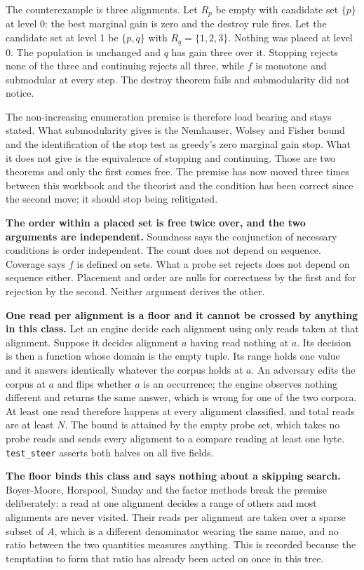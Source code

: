 The counterexample is three alignments. Let \(R_p\) be empty with candidate set \(\{p\}\) at level 0: the best marginal gain is zero and the destroy rule fires. Let the candidate set at level 1 be \(\{p, q\}\) with \(R_q = \{1,2,3\}\). Nothing was placed at level 0. The population is unchanged and \(q\) has gain three over it. Stopping rejects none of the three and continuing rejects all three, while \(f\) is monotone and submodular at every step. The destroy theorem fails and submodularity did not notice.

The non-increasing enumeration premise is therefore load bearing and stays stated. What submodularity gives is the Nemhauser, Wolsey and Fisher bound and the identification of the stop test as greedy's zero marginal gain stop. What it does not give is the equivalence of stopping and continuing. Those are two theorems and only the first comes free. The premise has now moved three times between this workbook and the theorist and the condition has been correct since the second move; it should stop being relitigated.

\textbf{The order within a placed set is free twice over, and the two arguments are independent.} Soundness says the conjunction of necessary conditions is order independent. The count does not depend on sequence. Coverage says \(f\) is defined on sets. What a probe set rejects does not depend on sequence either. Placement and order are nulls for correctness by the first and for rejection by the second. Neither argument derives the other.

\textbf{One read per alignment is a floor and it cannot be crossed by anything in this class.} Let an engine decide each alignment using only reads taken at that alignment. Suppose it decides alignment \(a\) having read nothing at \(a\). Its decision is then a function whose domain is the empty tuple. Its range holds one value and it answers identically whatever the corpus holds at \(a\). An adversary edits the corpus at \(a\) and flips whether \(a\) is an occurrence; the engine observes nothing different and returns the same answer, which is wrong for one of the two corpora. At least one read therefore happens at every alignment classified, and total reads are at least \(N\). The bound is attained by the empty probe set, which takes no probe reads and sends every alignment to a compare reading at least one byte. \texttt{test\_steer} asserts both halves on all five fields.

\textbf{The floor binds this class and says nothing about a skipping search.} Boyer-Moore, Horspool, Sunday and the factor methods break the premise deliberately: a read at one alignment decides a range of others and most alignments are never visited. Their reads per alignment are taken over a sparse subset of \(A\), which is a different denominator wearing the same name, and no ratio between the two quantities measures anything. This is recorded because the temptation to form that ratio has already been acted on once in this tree.

